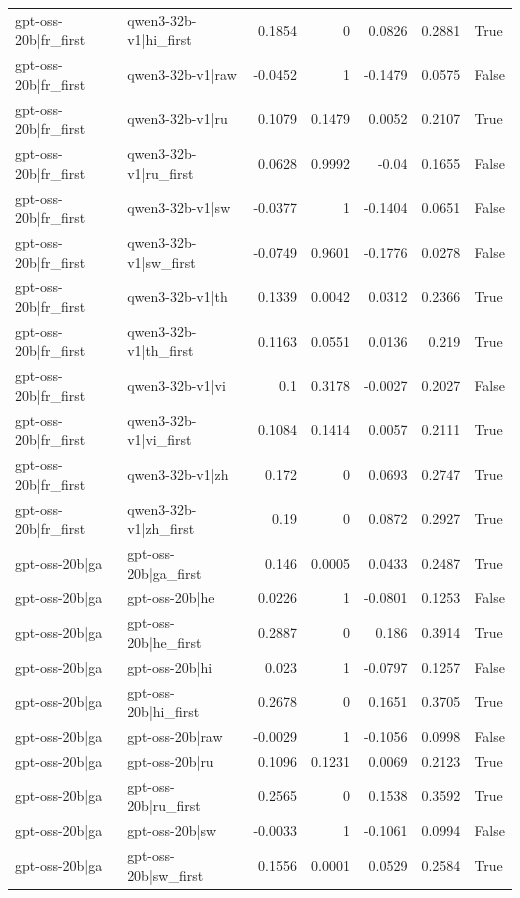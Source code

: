 \begin{table}
\begin{tabular}{l l r r r r l}
gpt-oss-20b|fr_first & qwen3-32b-v1|hi_first & 0.1854 & 0 & 0.0826 & 0.2881 & True \\
gpt-oss-20b|fr_first & qwen3-32b-v1|raw & -0.0452 & 1 & -0.1479 & 0.0575 & False \\
gpt-oss-20b|fr_first & qwen3-32b-v1|ru & 0.1079 & 0.1479 & 0.0052 & 0.2107 & True \\
gpt-oss-20b|fr_first & qwen3-32b-v1|ru_first & 0.0628 & 0.9992 & -0.04 & 0.1655 & False \\
gpt-oss-20b|fr_first & qwen3-32b-v1|sw & -0.0377 & 1 & -0.1404 & 0.0651 & False \\
gpt-oss-20b|fr_first & qwen3-32b-v1|sw_first & -0.0749 & 0.9601 & -0.1776 & 0.0278 & False \\
gpt-oss-20b|fr_first & qwen3-32b-v1|th & 0.1339 & 0.0042 & 0.0312 & 0.2366 & True \\
gpt-oss-20b|fr_first & qwen3-32b-v1|th_first & 0.1163 & 0.0551 & 0.0136 & 0.219 & True \\
gpt-oss-20b|fr_first & qwen3-32b-v1|vi & 0.1 & 0.3178 & -0.0027 & 0.2027 & False \\
gpt-oss-20b|fr_first & qwen3-32b-v1|vi_first & 0.1084 & 0.1414 & 0.0057 & 0.2111 & True \\
gpt-oss-20b|fr_first & qwen3-32b-v1|zh & 0.172 & 0 & 0.0693 & 0.2747 & True \\
gpt-oss-20b|fr_first & qwen3-32b-v1|zh_first & 0.19 & 0 & 0.0872 & 0.2927 & True \\
gpt-oss-20b|ga & gpt-oss-20b|ga_first & 0.146 & 0.0005 & 0.0433 & 0.2487 & True \\
gpt-oss-20b|ga & gpt-oss-20b|he & 0.0226 & 1 & -0.0801 & 0.1253 & False \\
gpt-oss-20b|ga & gpt-oss-20b|he_first & 0.2887 & 0 & 0.186 & 0.3914 & True \\
gpt-oss-20b|ga & gpt-oss-20b|hi & 0.023 & 1 & -0.0797 & 0.1257 & False \\
gpt-oss-20b|ga & gpt-oss-20b|hi_first & 0.2678 & 0 & 0.1651 & 0.3705 & True \\
gpt-oss-20b|ga & gpt-oss-20b|raw & -0.0029 & 1 & -0.1056 & 0.0998 & False \\
gpt-oss-20b|ga & gpt-oss-20b|ru & 0.1096 & 0.1231 & 0.0069 & 0.2123 & True \\
gpt-oss-20b|ga & gpt-oss-20b|ru_first & 0.2565 & 0 & 0.1538 & 0.3592 & True \\
gpt-oss-20b|ga & gpt-oss-20b|sw & -0.0033 & 1 & -0.1061 & 0.0994 & False \\
gpt-oss-20b|ga & gpt-oss-20b|sw_first & 0.1556 & 0.0001 & 0.0529 & 0.2584 & True \\

\end{tabular}
\end{table}

